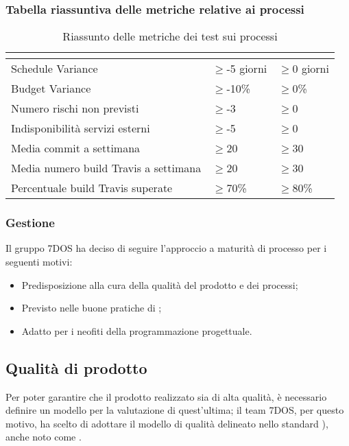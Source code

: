\subsubsection{Tabella riassuntiva delle metriche relative ai processi}
\renewcommand{\arraystretch}{1.5}
\begin{table}[H]
	\centering
	\begin{tabular}{|C{5cm}|C{4cm}|C{4cm}|}
		\hline
		\textbf{\color{title_text}{Nome Metrica}} &  \textbf{\color{title_text}{Range accettabile}} & \textbf{\color{title_text}{Range ottimale}} \\ \hline
		Schedule Variance & $\geq$-5 giorni  & $\geq$0 giorni \\ \hline
		Budget Variance&$\geq$-10\% &$\geq$0\% \\ \hline
		Numero rischi non previsti&$\geq$-3 &$\geq$0 \\ \hline
		Indisponibilità servizi esterni&$\geq$-5 &$\geq$0 \\ \hline
		Media commit a settimana&$\geq$20 &$\geq$30 \\ \hline
		Media numero build Travis a settimana&$\geq$20 &$\geq$30 \\ \hline
		Percentuale build Travis superate& $\geq$70\% &$\geq$80\% \\ \hline

	\end{tabular}
	\caption{Riassunto delle metriche dei test sui processi}
	\label{tabella:riassunto metriche dei test sui processi}
\end{table}
\renewcommand{\arraystretch}{1}

\subsubsection{Gestione}
	Il gruppo 7DOS ha deciso di seguire l'approccio a maturità di processo per i seguenti motivi:
	\begin{itemize}
	\item Predisposizione alla cura della qualità del prodotto e dei processi;
	\item Previsto nelle buone pratiche di ;
	\item Adatto per i neofiti della programmazione progettuale.
	\end{itemize}
	
\subsection{Qualità di prodotto}
Per poter garantire che il prodotto realizzato sia di alta qualità, è necessario definire un modello per la valutazione di quest'ultima; il team 7DOS, per questo motivo, ha scelto di adottare il modello di qualità delineato nello standard ), anche noto come .

